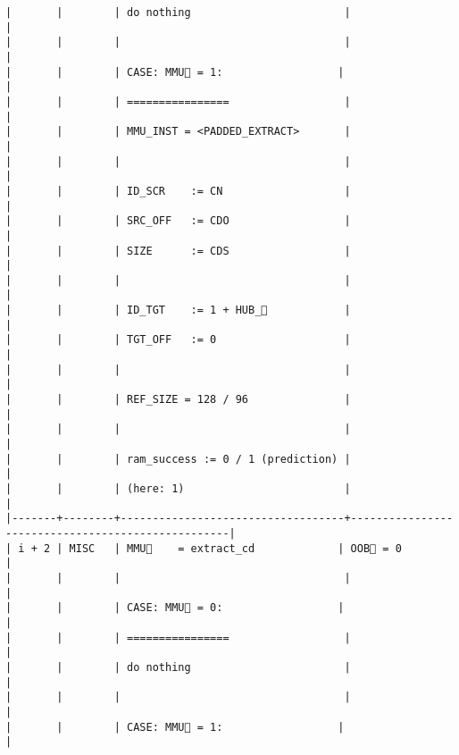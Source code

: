 \documentclass[varwidth=\maxdimen,margin=0.5cm,multi={verbatim}]{standalone}
\begin{document}
\begin{verbatim}
|       |        | do nothing                        |                                                   |
|       |        |                                   |                                                   |
|       |        | CASE: MMU🏴 = 1:                  |                                                   |
|       |        | ================                  |                                                   |
|       |        | MMU_INST = <PADDED_EXTRACT>       |                                                   |
|       |        |                                   |                                                   |
|       |        | ID_SCR    := CN                   |                                                   |
|       |        | SRC_OFF   := CDO                  |                                                   |
|       |        | SIZE      := CDS                  |                                                   |
|       |        |                                   |                                                   |
|       |        | ID_TGT    := 1 + HUB_            |                                                   |
|       |        | TGT_OFF   := 0                    |                                                   |
|       |        |                                   |                                                   |
|       |        | REF_SIZE = 128 / 96               |                                                   |
|       |        |                                   |                                                   |
|       |        | ram_success := 0 / 1 (prediction) |                                                   |
|       |        | (here: 1)                         |                                                   |
|-------+--------+-----------------------------------+---------------------------------------------------|
| i + 2 | MISC   | MMU🏴    = extract_cd             | OOB🏴 = 0                                         |
|       |        |                                   |                                                   |
|       |        | CASE: MMU🏴 = 0:                  |                                                   |
|       |        | ================                  |                                                   |
|       |        | do nothing                        |                                                   |
|       |        |                                   |                                                   |
|       |        | CASE: MMU🏴 = 1:                  |                                                   |

\end{verbatim}
\end{document}

